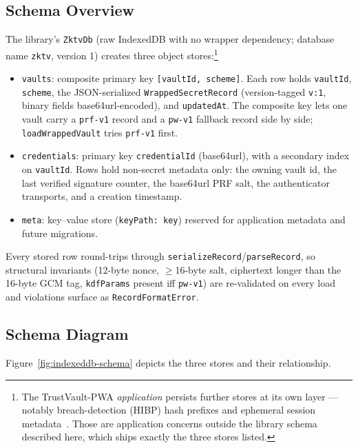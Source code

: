 \documentclass[runningheads]{llncs}
\begin{document}
\subsection{Schema Overview}
The library's \texttt{ZktvDb} (raw IndexedDB with no wrapper dependency; database name \texttt{zktv}, version 1) creates three object stores:\footnote{The TrustVault-PWA \emph{application} persists further stores at its own layer --- notably breach-detection (HIBP) hash prefixes and ephemeral session metadata~\cite{trustvault-security}. Those are application concerns outside the library schema described here, which ships exactly the three stores listed.}
\begin{itemize}
  \item \texttt{vaults}: composite primary key \texttt{[vaultId, scheme]}. Each row holds \texttt{vaultId}, \texttt{scheme}, the JSON-serialized \texttt{WrappedSecretRecord} (version-tagged \texttt{v:1}, binary fields base64url-encoded), and \texttt{updatedAt}. The composite key lets one vault carry a \texttt{prf-v1} record and a \texttt{pw-v1} fallback record side by side; \texttt{loadWrappedVault} tries \texttt{prf-v1} first.
  \item \texttt{credentials}: primary key \texttt{credentialId} (base64url), with a secondary index on \texttt{vaultId}. Rows hold non-secret metadata only: the owning vault id, the last verified signature counter, the base64url PRF salt, the authenticator transports, and a creation timestamp.
  \item \texttt{meta}: key--value store (\texttt{keyPath: key}) reserved for application metadata and future migrations.
\end{itemize}
Every stored row round-trips through \texttt{serializeRecord}/\texttt{parseRecord}, so structural invariants (12-byte nonce, $\geq$16-byte salt, ciphertext longer than the 16-byte GCM tag, \texttt{kdfParams} present iff \texttt{pw-v1}) are re-validated on every load and violations surface as \texttt{RecordFormatError}.

\subsection{Schema Diagram}
Figure~\ref{fig:indexeddb-schema} depicts the three stores and their relationship.
\end{document}
